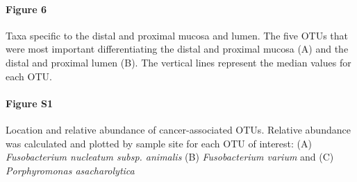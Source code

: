 \documentclass[12pt,]{article}
\let\oldparagraph\paragraph
\renewcommand{\paragraph}[1]{\oldparagraph{#1}\mbox{}}
\begin{document}
\paragraph{Figure 6}\label{figure-6}

Taxa specific to the distal and proximal mucosa and lumen. The five OTUs
that were most important differentiating the distal and proximal mucosa
(A) and the distal and proximal lumen (B). The vertical lines represent
the median values for each OTU.

\paragraph{Figure S1}\label{figure-s1}

Location and relative abundance of cancer-associated OTUs. Relative
abundance was calculated and plotted by sample site for each OTU of
interest: (A) \emph{Fusobacterium nucleatum subsp. animalis} (B)
\emph{Fusobacterium varium} and (C) \emph{Porphyromonas asacharolytica}
\end{document}

